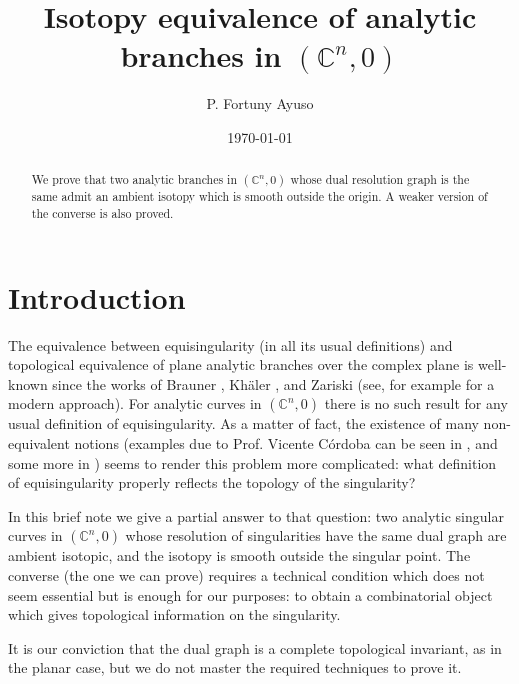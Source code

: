 \documentclass[a4paper,10pt]{amsart}
\title{Isotopy equivalence of analytic branches in $(\mathbb{C}^n,0)$}
\author{P. Fortuny Ayuso}
\date{\today}
\begin{document}
\newcommand{\mex}[1]{\ensuremath{\left\lceil #1 \right\rceil}}
\begin{abstract}
  We prove that two analytic branches in $(\mathbb{C}^n,0)$ whose dual resolution graph is the same admit an ambient isotopy which is smooth outside the origin. A weaker version of the converse is also proved.
\end{abstract}
\maketitle
\section{Introduction}
The equivalence between equisingularity (in all its usual definitions) and topological equivalence of plane analytic branches over the complex plane is well-known since the works of Brauner \cite{Brauner}, Kh\"aler \cite{Kahler}, and Zariski \cite{Zariski-1965} (see, for example \cite{Wall} for a modern approach). For analytic curves in $(\mathbb{C}^n,0)$ there is no such result for any usual definition of equisingularity. As a matter of fact, the existence of many non-equivalent notions (examples due to Prof. Vicente Córdoba can be seen in \cite{Campillo}, and some more in \cite{Castellanos-2005}) seems to render this problem more complicated: what definition of equisingularity properly reflects the topology of the singularity?

In this brief note we give a partial answer to that question: two analytic singular curves in $(\mathbb{C}^n,0)$ whose resolution of singularities have the same dual graph are ambient isotopic, and the isotopy is smooth outside the singular point. The converse (the one we can prove) requires a technical condition which does not seem essential but is enough for our purposes: to obtain a combinatorial object which gives topological information on the singularity.

It is our conviction that the dual graph is a complete topological invariant, as in the planar case, but we do not master the required techniques to prove it.
\end{document}
